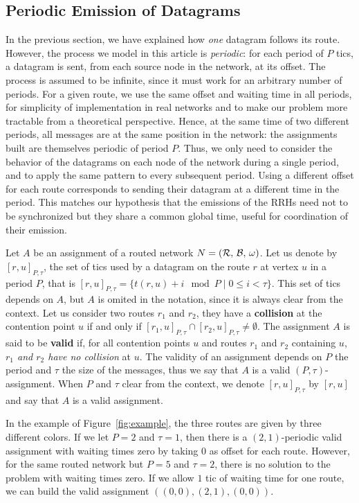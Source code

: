 \documentclass[a4paper,10pt]{article}
\begin{document}
 	\subsection{Periodic Emission of Datagrams}

	In the previous section, we have explained how \emph{one} datagram follows its route.
	However, the process we model in this article is \emph{periodic}: for each period of $P$ tics, a datagram is sent, from each source node in the network, at its offset. The process is assumed to be infinite, since it must work for an arbitrary number of periods. For a given route, we use the same offset and waiting time in all periods, for simplicity of implementation in real networks and to make our problem more tractable from a theoretical perspective. Hence, at the same time of two different periods, all messages are at the same position in the network: the assignments built are themselves periodic of period $P$. Thus, we only need to consider the behavior of the datagrams on each node of the network during a single period, and to apply the same pattern to every subsequent period. 
 	Using a different offset for each route corresponds to sending their datagram at a different time in the period. This matches our hypothesis that the emissions of the RRHs need not to be synchronized but they share a common global time, useful for coordination of their emission.

 	Let $A$ be an assignment of a routed network $N = (\cal{R},\,\cal{B},\,\omega)$.
    Let us denote by $[r,u]_{P,\tau}$, the set of tics used by a datagram on the route $r$ at vertex $u$ in a period $P$, that is $[r,u]_{P,\tau} = \{t(r,u) + i \mod P \mid 0 \leq i < \tau \}$. This set of tics depends on $A$,
    but $A$ is omited in the notation, since it is always clear from the context.
    Let us consider two routes $r_1$ and $r_2$, they have a {\bf collision} at the contention point $u$ if and only if $[r_1,u]_{P,\tau} \cap [r_2,u]_{P,\tau} \neq \emptyset$.
    The assignment $A$ is said to be \textbf{valid} if, for all contention points $u$ and routes $r_1$ and $r_2$ containing $u$, \emph{$r_1$ and $r_2$ have no collision} at $u$. 
    The validity of an assignment depends on $P$ the period and $\tau$ the size of the messages,
    thus we say that $A$ is a valid $(P,\tau)$-assignment. When $P$ and $\tau$ clear from the context, 
    we denote $[r,u]_{P,\tau}$ by $[r,u]$ and say that $A$ is a valid assignment. 

     In the example of Figure~\ref{fig:example}, the three routes are given by three different colors. If we let $P = 2$ and $\tau = 1$, then there is a $(2,1)$-periodic valid assignment with waiting times zero by taking $0$ as offset for each route. However, for the same routed network but $P=5$ and $\tau = 2$, there is no solution to the problem with waiting times zero. If we allow $1$ tic of waiting time for one route, we can build the valid assignment $((0,0),(2,1),(0,0))$.
\end{document}
